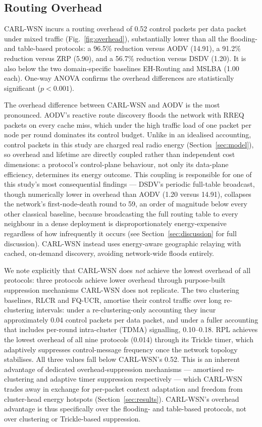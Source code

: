 \documentclass[12pt]{article}
\begin{document}
\subsection{Routing Overhead}

CARL-WSN incurs a routing overhead of 0.52 control packets per data
packet under mixed traffic (Fig.~\ref{fig:overhead}), substantially
lower than all the flooding- and table-based protocols: a
96.5\% reduction versus AODV (14.91), a 91.2\% reduction versus
ZRP (5.90), and a 56.7\% reduction versus DSDV (1.20). It is also
below the two domain-specific baselines EH-Routing and MSLBA
(1.00 each). One-way ANOVA confirms the overhead differences are
statistically significant ($p < 0.001$).

The overhead difference between CARL-WSN and AODV is the most
pronounced. AODV's reactive route discovery floods the network with
RREQ packets on every cache miss, which under the high traffic load
of one packet per node per round dominates its control budget. Unlike
in an idealised accounting, control packets in this study are charged
real radio energy (Section~\ref{sec:model}), so overhead and lifetime
are directly coupled rather than independent cost dimensions: a
protocol's control-plane behaviour, not only its data-plane
efficiency, determines its energy outcome. This coupling is
responsible for one of this study's most consequential findings ---
DSDV's periodic full-table broadcast, though numerically lower in
overhead than AODV (1.20 versus 14.91), collapses the network's
first-node-death round to 59, an order of magnitude below every
other classical baseline, because broadcasting the full routing
table to every neighbour in a dense deployment is disproportionately
energy-expensive regardless of how infrequently it occurs (see
Section~\ref{sec:discussion} for full discussion). CARL-WSN instead
uses energy-aware geographic relaying with cached, on-demand
discovery, avoiding network-wide floods entirely.

We note explicitly that CARL-WSN does \emph{not} achieve the lowest
overhead of all protocols: three protocols achieve lower overhead
through purpose-built suppression mechanisms CARL-WSN does not
replicate. The two clustering baselines, RLCR and FQ-UCR, amortise
their control traffic over long re-clustering intervals: under a
re-clustering-only accounting they incur approximately 0.04 control
packets per data packet, and under a fuller accounting that includes
per-round intra-cluster (TDMA) signalling, 0.10--0.18. RPL achieves
the lowest overhead of all nine protocols (0.014) through its
Trickle timer, which adaptively suppresses control-message frequency
once the network topology stabilises. All three values fall below
CARL-WSN's 0.52. This is an inherent advantage of dedicated
overhead-suppression mechanisms --- amortised re-clustering and
adaptive timer suppression respectively --- which CARL-WSN trades
away in exchange for per-packet context adaptation and freedom from
cluster-head energy hotspots (Section~\ref{sec:results}). CARL-WSN's
overhead advantage is thus specifically over the flooding- and
table-based protocols, not over clustering or Trickle-based
suppression.
\end{document}
